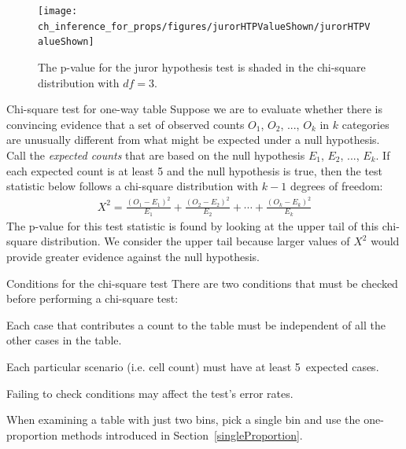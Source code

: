 \begin{figure}[h]
\centering
\texttt{[image: ch\_inference\_for\_props/figures/jurorHTPValueShown/jurorHTPValueShown]}
\caption{The p-value for the juror hypothesis test is shaded in the chi-square distribution with $df=3$.}
\label{jurorHTPValueShown}
\end{figure}

\begin{onebox}{Chi-square test for one-way table}
  Suppose we are to evaluate whether there is convincing
  evidence that a set of observed counts $O_1$, $O_2$, ...,
  $O_k$ in $k$ categories are unusually different from what
  might be expected under a null hypothesis.
  Call the \emph{expected counts} that are based on the null
  hypothesis $E_1$, $E_2$, ..., $E_k$.
  If each expected count is at least 5 and the null hypothesis
  is true, then the test statistic below follows a chi-square
  distribution with $k-1$ degrees of freedom:
  \begin{align*}
  X^2
    = \frac{(O_1 - E_1)^2}{E_1} +
        \frac{(O_2 - E_2)^2}{E_2} +
        \cdots +
        \frac{(O_k - E_k)^2}{E_k}
  \end{align*}
  The p-value for this test statistic is found by looking
  at the upper tail of this chi-square distribution.
  We consider the upper tail because larger values of $X^2$
  would provide greater evidence against the null hypothesis.
\end{onebox}

\begin{onebox}{Conditions for the chi-square test}
  There are two conditions that must be checked before
  performing a chi-square test:\vspace{-1mm}
  \begin{description}
  \setlength{\itemsep}{0mm}
  \item[Independence.] Each case that contributes a count to
      the table must be independent of all the other cases in
      the table.
  \item[Sample size / distribution.] Each particular scenario
      (i.e. cell count) must have at least 5~expected cases.
  \end{description}
  Failing to check conditions may affect the test's error rates.
\end{onebox}

When examining a table with just two bins, pick a single bin and use the one-proportion methods introduced in Section~\ref{singleProportion}.


